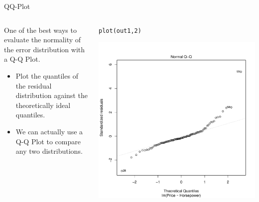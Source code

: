 \documentclass[10pt]{beamer}\usepackage[]{graphicx}\usepackage[]{color}
\makeatletter
\def\maxwidth{ %
  \ifdim\Gin@nat@width>\linewidth
    \linewidth
  \else
    \Gin@nat@width
  \fi
}
\newcommand{\hlnum}[1]{\textcolor[rgb]{0.69,0.494,0}{#1}}%
\newcommand{\hlstd}[1]{\textcolor[rgb]{0,0,0}{#1}}%
\newcommand{\hlkwd}[1]{\textcolor[rgb]{0.004,0.004,0.506}{#1}}%
\newenvironment{kframe}{%
 \def\at@end@of@kframe{}%
 \ifinner\ifhmode%
  \def\at@end@of@kframe{\end{minipage}}%
  \begin{minipage}{\columnwidth}%
 \fi\fi%
 \def\FrameCommand##1{\hskip\@totalleftmargin \hskip-\fboxsep
 \colorbox{shadecolor}{##1}\hskip-\fboxsep
     \hskip-\linewidth \hskip-\@totalleftmargin \hskip\columnwidth}%
 \MakeFramed {\advance\hsize-\width
   \@totalleftmargin\z@ \linewidth\hsize
   \@setminipage}}%
 {\par\unskip\endMakeFramed%
 \at@end@of@kframe}
\newenvironment{knitrout}{}{} %
\makeatother
\begin{document}
\begin{frame}{QQ-Plot}
  
  \begin{columns}
    \begin{column}{0.5\textwidth}

      One of the best ways to evaluate the normality of the error distribution
      with a Q-Q Plot.
      \vc
      \begin{itemize}
      \item Plot the quantiles of the residual distribution against the
        theoretically ideal quantiles.
        \vc
      \item We can actually use a Q-Q Plot to compare any two distributions.
      \end{itemize}

    \end{column}

    \begin{column}{0.5\textwidth}

\begin{knitrout}\footnotesize
{}\color{fgcolor}\begin{kframe}
\begin{alltt}
\hlkwd{plot}\hlstd{(out1,} \hlnum{2}\hlstd{)}
\end{alltt}
\end{kframe}

{\centering \includegraphics[width=\maxwidth]{figure/assumptions-unnamed-chunk-19-1} 

}


\end{knitrout}



    \end{column}
  \end{columns}

\end{frame}
\end{document}
